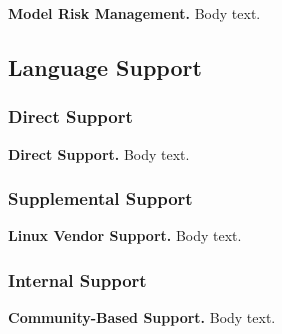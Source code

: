                 \textbf{Model Risk Management.}
                Body text.

        \subsection{Language Support}
 
            \subsubsection{Direct Support}

                \textbf{Direct Support.}
                Body text.

            \subsubsection{Supplemental Support}

                \textbf{Linux Vendor Support.}
                Body text.

            \subsubsection{Internal Support}
                            
                \textbf{Community-Based Support.}
                Body text.
